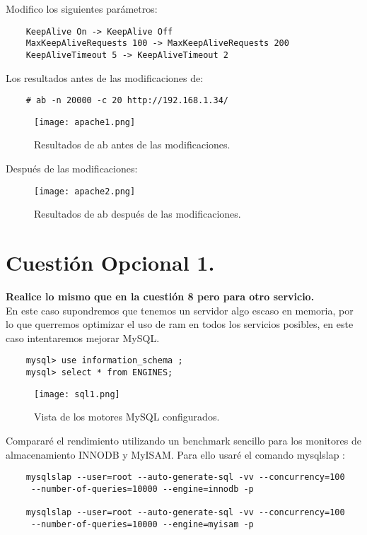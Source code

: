\documentclass[a4paper, 10pt]{article} %
\begin{document}
Modifico los siguientes parámetros:

\begin{verbatim}
    KeepAlive On -> KeepAlive Off
    MaxKeepAliveRequests 100 -> MaxKeepAliveRequests 200
    KeepAliveTimeout 5 -> KeepAliveTimeout 2
\end{verbatim}
Los resultados antes de las modificaciones de:
\begin{verbatim}
    # ab -n 20000 -c 20 http://192.168.1.34/
\end{verbatim}

\begin{figure}[H]
\centering 
\texttt{[image: apache1.png]} 
\caption{Resultados de ab antes de las modificaciones.} 
\label{contexto:figura} 
\end{figure}

Después de las modificaciones:

\begin{figure}[H]
\centering 
\texttt{[image: apache2.png]} 
\caption{Resultados de ab después de las modificaciones.} 
\label{contexto:figura} 
\end{figure} 

\pagebreak

\section{Cuestión Opcional 1.}
\textbf{Realice lo mismo que en la cuestión 8 pero para otro servicio.}\\

En este caso supondremos que tenemos un servidor algo escaso en memoria, por lo que querremos optimizar el uso de ram en todos los servicios posibles, en este caso intentaremos mejorar MySQL.

\begin{verbatim}
    mysql> use information_schema ;
    mysql> select * from ENGINES;
\end{verbatim}

\begin{figure}[H]
\centering 
\texttt{[image: sql1.png]} 
\caption{Vista de los motores MySQL configurados.} 
\label{contexto:figura} 
\end{figure} 

Compararé el rendimiento utilizando un benchmark sencillo para los monitores de almacenamiento INNODB y MyISAM. Para ello usaré el comando mysqlslap \cite{9}:

\begin{verbatim}
    mysqlslap --user=root --auto-generate-sql -vv --concurrency=100
     --number-of-queries=10000 --engine=innodb -p
     
    mysqlslap --user=root --auto-generate-sql -vv --concurrency=100
     --number-of-queries=10000 --engine=myisam -p
\end{verbatim}
\end{document}
